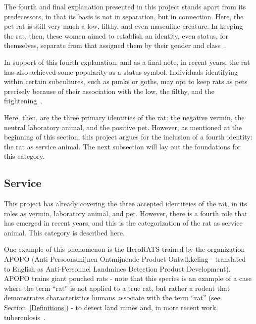\documentclass[12pt]{article}
\begin{document}
The fourth and final explanation presented in this project stands apart from its predecessors, in that its basis is not in separation, but in connection. Here, the pet rat is still very much a low, filthy, and even masculine creature. In keeping the rat, then, these women aimed to establish an identity, even status, for themselves, separate from that assigned them by their gender and class~\cite{Edelman2005}.

In support of this fourth explanation, and as a final note, in recent years, the rat has also achieved some popularity as a status symbol. Individuals identifying within certain subcultures, such as punks or goths, may opt to keep rats as pets precisely because of their association with the low, the filthy, and the frightening~\cite{Edelman2005}.

Here, then, are the three primary identities of the rat: the negative vermin, the neutral laboratory animal, and the positive pet. However, as mentioned at the beginning of this section, this project argues for the inclusion of a fourth identity: the rat as service animal. The next subsection will lay out the foundations for this category.

\subsection{Service} \label{Service}

This project has already covering the three accepted identiteies of the rat, in its roles as vermin, laboratory animal, and pet. However, there is a fourth role that has emerged in recent years, and this is the categorization of the rat as service animal. This category is described here.

One example of this phenomenon is the HeroRATS trained by the organization APOPO (Anti-Persoonsmijnen Ontmijnende Product Ontwikkeling - translated to English as Anti-Personnel Landmines Detection Product Development). APOPO trains giant pouched rats - note that this species is an example of a case where the term ``rat'' is not applied to a true rat, but rather a rodent that demonstrates characteristics humans associate with the term ``rat'' (see Section~\ref{Definitions}) - to detect land mines and, in more recent work, tuberculosis~\cite{APOPO}.
\end{document}
